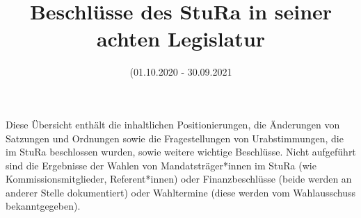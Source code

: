 \documentclass[fontsize=11pt]{scrartcl}[2011/04/02]
\title{Beschlüsse des StuRa in seiner achten Legislatur}
\date{(01.10.2020 - 30.09.2021}
\author{}
\begin{document}
\maketitle
Diese Übersicht enthält die inhaltlichen Positionierungen, die Änderungen von Satzungen und Ordnungen sowie die Fragestellungen von Urabstimmungen, die im StuRa beschlossen wurden, sowie weitere wichtige Beschlüsse. Nicht aufgeführt sind die Ergebnisse der Wahlen von Mandatsträger*innen im StuRa (wie Kommissionsmitglieder, Referent*innen) oder Finanzbeschlüsse (beide werden an anderer Stelle dokumentiert) oder Wahltermine (diese werden vom Wahlausschuss bekanntgegeben).
\newpage
\tableofcontents
    
    
    
    
    
\end{document}
